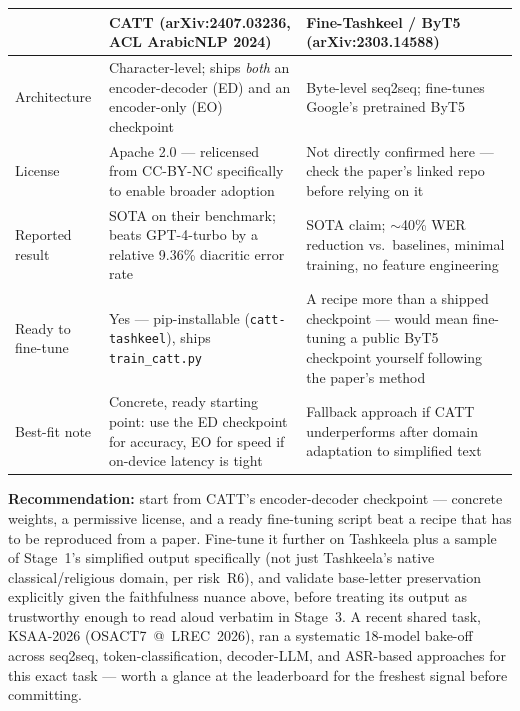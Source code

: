 \documentclass[11pt,a4paper]{article}
\begin{document}
\begin{center}
\small
\begin{tabular}{@{}p{2.5cm}p{4.75cm}p{4.75cm}@{}}
\toprule
& \textbf{CATT} (arXiv:2407.03236, ACL ArabicNLP 2024) & \textbf{Fine-Tashkeel / ByT5} (arXiv:2303.14588) \\
\midrule
Architecture & Character-level; ships \emph{both} an encoder-decoder (ED) and
an encoder-only (EO) checkpoint & Byte-level seq2seq; fine-tunes Google's
pretrained ByT5 \\
\addlinespace
License & Apache 2.0 --- relicensed from CC-BY-NC specifically to enable
broader adoption & Not directly confirmed here --- check the paper's linked
repo before relying on it \\
\addlinespace
Reported result & SOTA on their benchmark; beats GPT-4-turbo by a relative
9.36\% diacritic error rate & SOTA claim; $\sim$40\% WER reduction vs.\
baselines, minimal training, no feature engineering \\
\addlinespace
Ready to fine-tune & Yes --- pip-installable (\texttt{catt-tashkeel}), ships
\texttt{train\_catt.py} & A recipe more than a shipped checkpoint --- would
mean fine-tuning a public ByT5 checkpoint yourself following the paper's
method \\
\addlinespace
Best-fit note & Concrete, ready starting point: use the ED checkpoint for
accuracy, EO for speed if on-device latency is tight & Fallback approach if
CATT underperforms after domain adaptation to simplified text \\
\bottomrule
\end{tabular}
\end{center}

\textbf{Recommendation:} start from CATT's encoder-decoder checkpoint ---
concrete weights, a permissive license, and a ready fine-tuning script beat a
recipe that has to be reproduced from a paper. Fine-tune it further on
Tashkeela plus a sample of Stage~1's simplified output specifically (not just
Tashkeela's native classical/religious domain, per risk~R6), and validate
base-letter preservation explicitly given the faithfulness nuance above,
before treating its output as trustworthy enough to read aloud verbatim in
Stage~3. A recent shared task, KSAA-2026 (OSACT7~@~LREC~2026), ran a
systematic 18-model bake-off across seq2seq, token-classification,
decoder-LLM, and ASR-based approaches for this exact task --- worth a glance
at the leaderboard for the freshest signal before committing.
\end{document}
